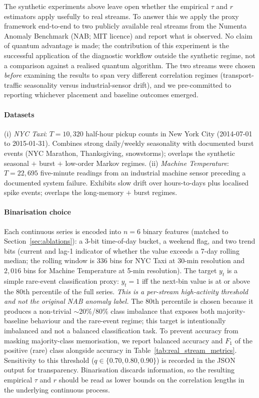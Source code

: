 \documentclass[preprint,12pt,authoryear]{elsarticle}
\begin{document}
The synthetic experiments above leave open whether the empirical $\tau$ and $r$ estimators apply usefully to real streams. To answer this we apply the proxy framework end-to-end to two publicly available real streams from the Numenta Anomaly Benchmark \citep{ahmad2017numenta} (NAB; MIT licence) and report what is observed. No claim of quantum advantage is made; the contribution of this experiment is the successful application of the diagnostic workflow outside the synthetic regime, not a comparison against a realised quantum algorithm. The two streams were chosen \emph{before} examining the results to span very different correlation regimes (transport-traffic seasonality versus industrial-sensor drift), and we pre-committed to reporting whichever placement and baseline outcomes emerged.

\paragraph{Datasets} (i) \emph{NYC Taxi}: $T = 10{,}320$ half-hour pickup counts in New York City (2014-07-01 to 2015-01-31). Combines strong daily/weekly seasonality with documented burst events (NYC Marathon, Thanksgiving, snowstorms); overlaps the synthetic seasonal $+$ burst $+$ low-order Markov regimes. (ii) \emph{Machine Temperature}: $T = 22{,}695$ five-minute readings from an industrial machine sensor preceding a documented system failure. Exhibits slow drift over hours-to-days plus localised spike events; overlaps the long-memory $+$ burst regimes.

\paragraph{Binarisation choice} Each continuous series is encoded into $n = 6$ binary features (matched to Section~\ref{sec:ablations}): a 3-bit time-of-day bucket, a weekend flag, and two trend bits (current and lag-1 indicator of whether the value exceeds a 7-day rolling median; the rolling window is $336$ bins for NYC Taxi at 30-min resolution and $2{,}016$ bins for Machine Temperature at 5-min resolution). The target $y_t$ is a simple rare-event classification proxy: $y_t = 1$ iff the next-bin value is at or above the 80th percentile of the full series. \emph{This is a per-stream high-activity threshold and not the original NAB anomaly label.} The 80th percentile is chosen because it produces a non-trivial $\sim$20\%/80\% class imbalance that exposes both majority-baseline behaviour and the rare-event regime; this target is intentionally imbalanced and not a balanced classification task. To prevent accuracy from masking majority-class memorisation, we report balanced accuracy and $F_1$ of the positive (rare) class alongside accuracy in Table~\ref{tab:real_stream_metrics}. Sensitivity to this threshold ($q \in \{0.70, 0.80, 0.90\}$) is recorded in the JSON output for transparency. Binarisation discards information, so the resulting empirical $\tau$ and $r$ should be read as lower bounds on the correlation lengths in the underlying continuous process.
\end{document}
